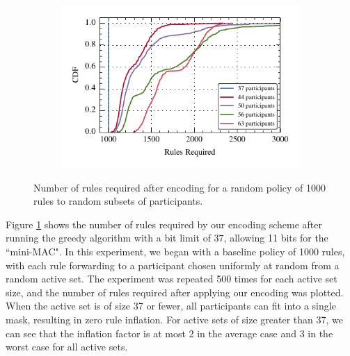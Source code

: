 \begin{figure}[t!] 
\begin{minipage}{1\linewidth}
\begin{subfigure}[b]{0.96\linewidth}
\includegraphics[width=\linewidth]{figures/rule_cdf}
\end{subfigure} 
\end{minipage} 
\caption{Number of rules required after encoding for a random policy of 1000 rules to random subsets of participants.}
\label{fig:rules}
\end{figure}

Figure \ref{fig:rules} shows the number of rules required by our encoding scheme after running the greedy algorithm with a bit limit of 37, allowing 11 bits for the ``mini-MAC". In this experiment, we began with a baseline policy of 1000 rules, with each rule forwarding to a participant chosen uniformly at random from a random active set. The experiment was repeated 500 times for each active set size, and the number of rules required after applying our encoding was plotted. When the active set is of size 37 or fewer, all participants can fit into a single mask, resulting in zero rule inflation. For active sets of size greater than 37, we can see that the inflation factor is at most 2 in the average case and 3 in the worst case for all active sets. 


